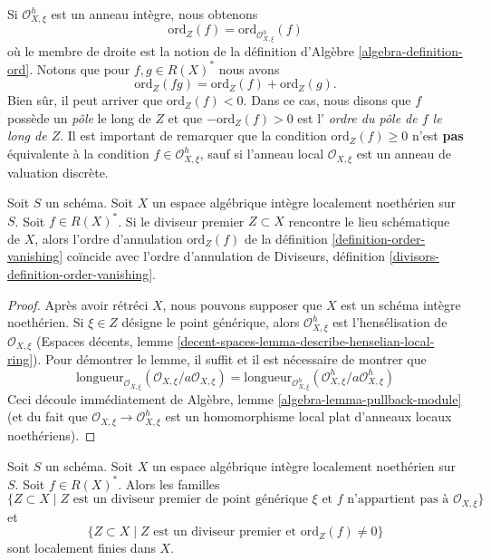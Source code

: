 \noindent
Si $\mathcal{O}_{X, \xi}^h$ est un anneau intègre, nous obtenons
$$
\text{ord}_Z(f) = \text{ord}_{\mathcal{O}_{X, \xi}^h}(f)
$$
où le membre de droite est la notion de
la définition d'Algèbre \ref{algebra-definition-ord}.
Notons que pour $f, g \in R(X)^*$ nous avons
$$
\text{ord}_Z(fg) = \text{ord}_Z(f) + \text{ord}_Z(g).
$$
Bien sûr, il peut arriver que $\text{ord}_Z(f) < 0$.
Dans ce cas, nous disons que $f$ possède un {\it pôle} le long de $Z$
et que $-\text{ord}_Z(f) > 0$ est l'
{\it ordre du pôle de $f$ le long de $Z$}. Il est important de remarquer que
la condition $\text{ord}_Z(f) \geq 0$ n'est {\bf pas} équivalente
à la condition $f \in \mathcal{O}_{X, \xi}^h$, sauf si l'anneau local
$\mathcal{O}_{X, \xi}$ est un anneau de valuation discrète.

\begin{lemma}
\label{lemma-order-vanishing-agrees}
Soit $S$ un schéma. Soit $X$ un espace algébrique intègre localement noethérien
sur $S$. Soit $f \in R(X)^*$. Si le diviseur premier
$Z \subset X$ rencontre le lieu schématique de $X$, alors l'ordre
d'annulation $\text{ord}_Z(f)$ de la définition \ref{definition-order-vanishing}
coïncide avec l'ordre d'annulation de
Diviseurs, définition \ref{divisors-definition-order-vanishing}.
\end{lemma}

\begin{proof}
Après avoir rétréci $X$, nous pouvons supposer que $X$ est un schéma intègre noethérien.
Si $\xi \in Z$ désigne le point générique, alors
$\mathcal{O}_{X, \xi}^h$ est l'hensélisation de $\mathcal{O}_{X, \xi}$
(Espaces décents, lemme \ref{decent-spaces-lemma-describe-henselian-local-ring}).
Pour démontrer le lemme, il suffit et il est nécessaire de montrer que
$$
\text{longueur}_{\mathcal{O}_{X, \xi}}
(\mathcal{O}_{X, \xi}/a \mathcal{O}_{X, \xi}) =
\text{longueur}_{\mathcal{O}_{X, \xi}^h}
(\mathcal{O}_{X, \xi}^h/a \mathcal{O}_{X, \xi}^h)
$$
Ceci découle immédiatement de
Algèbre, lemme \ref{algebra-lemma-pullback-module}
(et du fait que $\mathcal{O}_{X, \xi} \to \mathcal{O}_{X, \xi}^h$
est un homomorphisme local plat d'anneaux locaux noethériens).
\end{proof}

\begin{lemma}
\label{lemma-divisor-locally-finite}
Soit $S$ un schéma. Soit $X$ un espace algébrique intègre localement noethérien
sur $S$. Soit $f \in R(X)^*$. Alors les familles
$$
\{Z \subset X \mid Z\text{ est un diviseur premier de point générique }\xi
\text{ et }f\text{ n'appartient pas à }\mathcal{O}_{X, \xi}\}
$$
et
$$
\{Z \subset X \mid Z \text{ est un diviseur premier et }\text{ord}_Z(f) \not = 0\}
$$
sont localement finies dans $X$.
\end{lemma}

